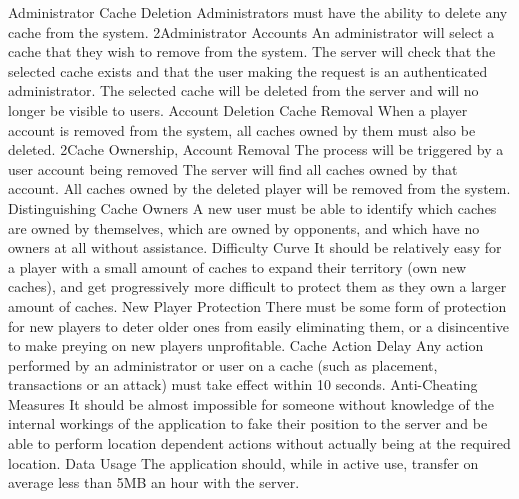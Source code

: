 			{Administrator Cache Deletion}
			{Administrators must have the ability to delete any cache from the
			system.}
			{2}{Administrator Accounts}
			{An administrator will select a cache that they wish to remove from
			the system.}
			{The server will check that the selected cache exists and that the
			user making the request is an authenticated administrator.}
			{The selected cache will be deleted from the server and will no
			longer be visible to users.}
		\funcreq %
			{Account Deletion Cache Removal}
			{When a player account is removed from the system, all caches owned
			by them must also be deleted.}
			{2}{Cache Ownership, Account Removal}
			{The process will be triggered by a user account being removed}
			{The server will find all caches owned by that account.}
			{All caches owned by the deleted player will be removed from the
			system.}
		\nonfuncreq %
			{Distinguishing Cache Owners}
			{A new user must be able to identify which caches are owned by
			themselves, which are owned by opponents, and which have no owners
			at all without assistance.}
		\nonfuncreq %
			{Difficulty Curve}
			{It should be relatively easy for a player with a small amount of
			caches to expand their territory (own new caches), and get
			progressively more difficult to protect them as they own a larger
			amount of caches.}
		\nonfuncreq %
			{New Player Protection}
			{There must be some form of protection for new players to deter
			older ones from easily eliminating them, or a disincentive to make
			preying on new players unprofitable.}
		\nonfuncreq %
			{Cache Action Delay}
			{Any action performed by an administrator or user on a cache (such
			as placement, transactions or an attack) must take effect within 10
			seconds.}
		\nonfuncreq %
			{Anti-Cheating Measures}
			{It should be almost impossible for someone without knowledge of
			the internal workings of the application to fake their position to
			the server and be able to perform location dependent actions
			without actually being at the required location.}
		\nonfuncreq %
			{Data Usage}
			{The application should, while in active use, transfer on average
			less than 5MB an hour with the server.}

